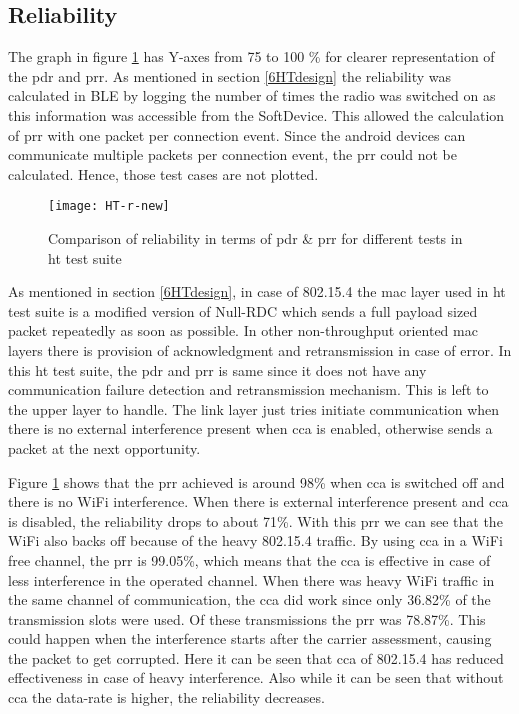 \subsection{Reliability}
The graph in figure \ref{fig:HT-r} has Y-axes from 75 to 100 \% for clearer representation of the \gls{pdr} and \gls{prr}. As mentioned in section \ref{6HTdesign} the reliability was calculated in BLE by logging the number of times the radio was switched on as this information was accessible from the SoftDevice. This allowed the calculation of \gls{prr} with one packet per connection event. Since the android devices can communicate multiple packets per connection event, the \gls{prr} could not be calculated. Hence, those test cases are not plotted.

\begin{figure}[b]
\texttt{[image: HT-r-new]}
\caption{Comparison of reliability in terms of \gls{pdr} \& \gls{prr} for different tests in \gls{ht} test suite }
\label{fig:HT-r}
\vspace{-6 pt}
\end{figure}

As mentioned in section \ref{6HTdesign}, in case of 802.15.4 the \gls{mac} layer used in \gls{ht} test suite is a modified version of Null-RDC which sends a full payload sized packet repeatedly as soon as possible. In other non-throughput oriented \gls{mac} layers there is provision of acknowledgment and retransmission in case of error. In this \gls{ht} test suite, the \gls{pdr} and \gls{prr} is same since it does not have any communication failure detection and retransmission mechanism. This is left to the upper layer to handle. The link layer just tries initiate communication when there is no external interference present when \gls{cca} is enabled, otherwise sends a packet at the next opportunity. 

Figure \ref{fig:HT-r} shows that the \gls{prr} achieved is around 98\% when \gls{cca} is switched off and there is no WiFi interference. When there is external interference present and \gls{cca} is disabled, the reliability drops to about 71\%. With this \gls{prr} we can see that the WiFi also backs off because of the heavy 802.15.4 traffic. By using \gls{cca} in a WiFi free channel, the \gls{prr} is 99.05\%, which means that the \gls{cca} is effective in case of less interference in the operated channel. When there was heavy WiFi traffic in the same channel of communication, the \gls{cca} did work since only 36.82\% of the transmission slots were used. Of these transmissions the \gls{prr} was 78.87\%. This could happen when the interference starts after the carrier assessment, causing the packet to get corrupted. Here it can be seen that \gls{cca} of 802.15.4 has reduced effectiveness in case of heavy interference. Also while it can be seen that without \gls{cca} the data-rate is higher, the reliability decreases.

